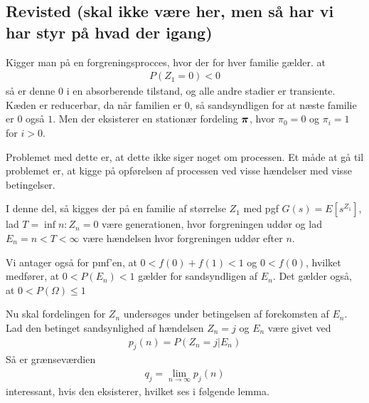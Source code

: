 \subsection{Revisted (skal ikke være her, men så har vi har styr på hvad der igang)}

Kigger man på en forgreningsprocces, hvor der for hver familie gælder. at \begin{align*}
P(Z_1=0)<0    
\end{align*}
så er denne $0$ i en absorberende tilstand, og alle andre stadier er  transiente. Kæden er reducerbar, da når familien er $0$, så sandsyndligen for at næste familie er $0$ også $1$. 
Men der eksisterer en stationær fordeling $\boldsymbol{\pi}$, hvor $\pi_0=0$ og $\pi_i=1$ for $i>0$. 

Problemet med dette er, at dette ikke siger noget om processen. Et måde at gå til problemet er, at kigge på opførelsen af processen ved visse hændelser med visse betingelser. 

I denne del, så kigges der på en familie af størrelse $Z_1$ med pgf $G(s)=E[s^{Z_1}]$,  
lad $T=\inf{n:Z_n=0}$ være generationen, hvor forgreningen uddør og 
lad $E_n={n<T<\infty}$
være hændelsen hvor forgreningen uddør efter $n$. 

Vi antager også for pmf'en, at $0<f(0)+f(1)<1$ og $0<f(0)$, hvilket medfører, at $0<P(E_n)<1$ gælder for sandsyndligen af $E_n$. Det gælder også, at $0< P(\Omega)\leq 1$

Nu skal fordelingen for $Z_n$ undersøges under betingelsen af forekomsten af $E_n$. Lad den betinget sandsynlighed af hændelsen $Z_n=j$ og $E_n$ være givet ved 
\begin{align*}
    p_j(n)=P(Z_n=j | E_n)
\end{align*}
Så er grænseværdien 
\begin{align*}
q_j=\lim_{n\to \infty} p_j(n)    
\end{align*}
interessant, hvis den eksisterer, hvilket ses i følgende lemma. 

